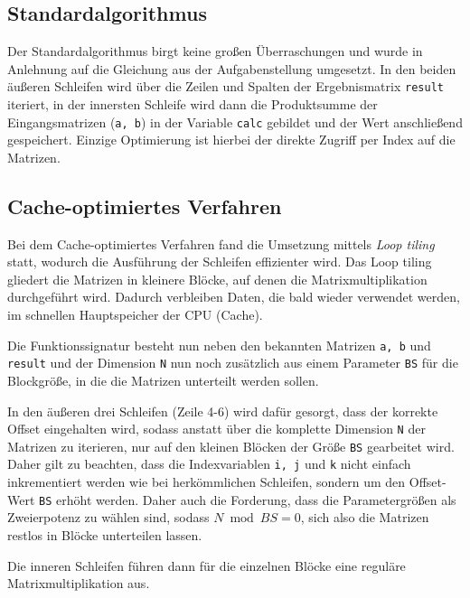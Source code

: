 \documentclass[a4paper,11pt]{scrartcl}
\begin{document}
\subsection{Standardalgorithmus}
Der Standardalgorithmus birgt keine großen Überraschungen und wurde in Anlehnung auf die 
Gleichung aus der Aufgabenstellung umgesetzt. In den beiden äußeren Schleifen 
wird über die Zeilen und Spalten der Ergebnismatrix \texttt{result} iteriert,
in der innersten Schleife wird dann die Produktsumme der Eingangsmatrizen (\texttt{a, b}) in der
Variable \texttt{calc} gebildet und der Wert anschließend gespeichert.
Einzige Optimierung ist hierbei der direkte Zugriff per Index auf die Matrizen.



\subsection{Cache-optimiertes Verfahren}
Bei dem Cache-optimiertes Verfahren fand die Umsetzung mittels \emph{Loop tiling} statt,
wodurch die Ausführung der Schleifen effizienter wird. Das Loop tiling gliedert die 
Matrizen in kleinere Blöcke, auf denen die Matrixmultiplikation durchgeführt wird.
Dadurch verbleiben Daten, die bald wieder verwendet werden, im schnellen Hauptspeicher der 
CPU (Cache). \newpage


Die Funktionssignatur besteht nun neben den bekannten Matrizen \texttt{a, b} und \texttt{result}
und der Dimension \texttt{N} nun noch zusätzlich aus einem Parameter \texttt{BS} für 
die Blockgröße, in die die Matrizen unterteilt werden sollen.\newline

In den äußeren drei Schleifen (Zeile 4-6) wird dafür gesorgt, dass der korrekte Offset eingehalten wird,
sodass anstatt über die komplette Dimension \texttt{N} der Matrizen zu iterieren, nur auf den
kleinen Blöcken der Größe \texttt{BS} gearbeitet wird. Daher gilt zu beachten, dass die Indexvariablen
\texttt{i,~j} und \texttt{k} nicht einfach inkrementiert werden wie bei herkömmlichen Schleifen,
sondern um den Offset-Wert \texttt{BS} erhöht werden. Daher auch die Forderung, dass 
die Parametergrößen als Zweierpotenz zu wählen sind, sodass $N \bmod BS = 0$, sich also die 
Matrizen restlos in Blöcke unterteilen lassen.\newline

Die inneren Schleifen führen dann 
für die einzelnen Blöcke eine reguläre Matrixmultiplikation aus.
\end{document}
